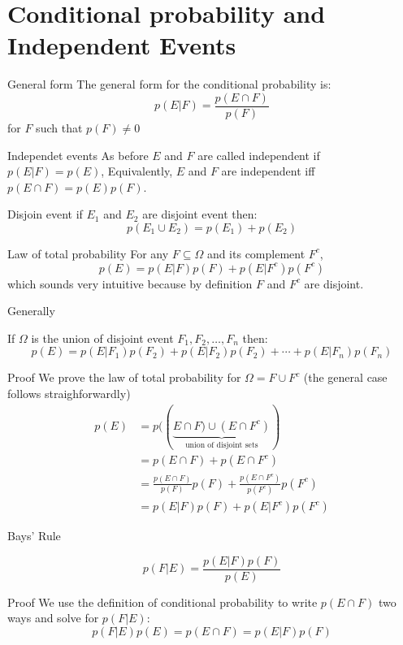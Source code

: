 \section{Conditional probability and Independent Events}
\begin{parag}{General form}
    The general form for the conditional probability is:
    \[p(E|F) = \frac{p(E \cap F)}{p(F)}\]
    for $F$ such that $p(F) \neq 0$
\end{parag}
\begin{parag}{Independet events}
    As before $E$ and $F$ are called independent if $p(E|F) = p(E)$, Equivalently, $E$ and $F$ are independent iff $p(E \cap F) = p(E)p(F)$.
\end{parag}
\begin{parag}{Disjoin event}
    if $E_1$ and $E_2$ are disjoint event then:
    \[p(E_1 \cup E_2) = p(E_1) + p(E_2)\]
\end{parag}
\begin{parag}{Law of total probability}
    For any $F \subseteq \Omega$ and its complement $F^c$,
    \[p(E) = p(E|F)p(F) + p(E|F^c)p(F^c)\]
    which sounds very intuitive because by definition $F$ and $F^c$ are disjoint.
    \begin{subparag}{Generally}
    \begin{theoreme}
        If $\Omega$ is the union of disjoint event $F_1, F_2, \dots, F_n$ then:
        \[p(E) = p(E|F_1)p(F_2) + p(E|F_2)p(F_2) + \cdots + p(E|F_n)p(F_n)\]
    \end{theoreme}
\end{subparag}
\begin{subparag}{Proof}
    We prove the law of total probability for $\Omega = F \cup F^c$ (the general case follows straighforwardly)
    \begin{align*}
        p(E) &= p((\underbrace{E \cap F) \cup(E \cap F^c)}_{\text{union of disjoint sets}})\\
        &= p(E \cap F) + p(E \cap F^c) \\
        &= \frac{p(E \cap F)}{p(F)}p(F) + \frac{p(E \cap F^c)}{p(F^c)}p(F^c) \\
        &= p(E|F)p(F) + p(E|F^c)p(F^c)
    \end{align*}
\end{subparag}
\end{parag}
\begin{parag}{Bays' Rule}
    \begin{theoreme}
        \[p(F|E) = \frac{p(E|F)p(F)}{p(E)}\]
    \end{theoreme}
    \begin{subparag}{Proof}
        We use the definition of conditional probability to write $p(E \cap F)$ two ways and solve for $p(F|E)$:
        \[p(F|E)p(E) = p(E \cap F) = p(E|F)p(F)\]
    \end{subparag}
\end{parag}

